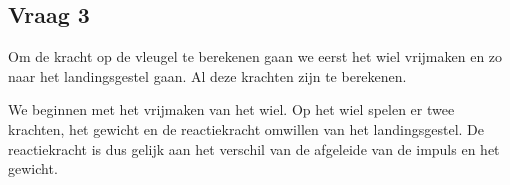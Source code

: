 \documentclass{article}
\begin{document}
\begin{maplegroup}
\begin{maplelatex}
{\end{maplelatex}
\end{maplegroup}
\subsection{\textbf{Vraag 3}}
\begin{maplelatex}\begin{Maple Normal}{
Om de kracht op de vleugel te berekenen gaan we eerst het wiel vrijmaken en zo naar het landingsgestel gaan. Al deze krachten zijn te berekenen.}\end{Maple Normal}
\end{maplelatex}
\begin{maplegroup}
\begin{Maple Normal}{
We beginnen met het vrijmaken van het wiel. Op het wiel spelen er twee krachten, het gewicht en de reactiekracht omwillen van het landingsgestel. De reactiekracht is dus gelijk aan het verschil van de afgeleide van de impuls en het gewicht.}\end{Maple Normal}

\end{maplegroup}
\begin{maplegroup}
\begin{mapleinput}
\end{mapleinput}
\mapleresult
{}
\end{maplegroup}
\end{document}
